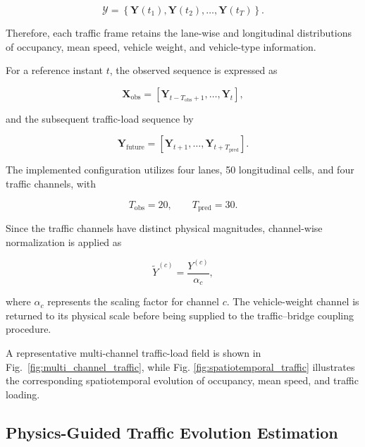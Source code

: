 \documentclass[journal]{IEEEtran}
\newcommand{\mathbfcal}[1]{\boldsymbol{\mathcal{#1}}}
\begin{document}
\begin{equation}
\mathbfcal{Y}
=
\left\{
\mathbf{Y}(t_1),
\mathbf{Y}(t_2),
\ldots,
\mathbf{Y}(t_T)
\right\}.
\label{eq:spatiotemporal_tensor}
\end{equation}

Therefore, each traffic frame retains the lane-wise and longitudinal distributions of occupancy, mean speed, vehicle weight, and vehicle-type information.

For a reference instant $t$, the observed sequence is expressed as

\begin{equation}
\mathbf{X}_{\mathrm{obs}}
=
\left[
\mathbf{Y}_{t-T_{\mathrm{obs}}+1},
\ldots,
\mathbf{Y}_{t}
\right],
\label{eq:observed_sequence}
\end{equation}

and the subsequent traffic-load sequence by

\begin{equation}
\mathbf{Y}_{\mathrm{future}}
=
\left[
\mathbf{Y}_{t+1},
\ldots,
\mathbf{Y}_{t+T_{\mathrm{pred}}}
\right].
\label{eq:future_sequence}
\end{equation}

The implemented configuration utilizes four lanes, 50 longitudinal cells, and four traffic channels, with

\begin{equation}
T_{\mathrm{obs}}=20,
\qquad
T_{\mathrm{pred}}=30.
\label{eq:sequence_lengths}
\end{equation}

Since the traffic channels have distinct physical magnitudes, channel-wise normalization is applied as

\begin{equation}
\widetilde{Y}^{(c)}
=
\frac{Y^{(c)}}{\alpha_c},
\label{eq:channel_normalization}
\end{equation}

where $\alpha_c$ represents the scaling factor for channel $c$. The vehicle-weight channel is returned to its physical scale before being supplied to the traffic--bridge coupling procedure.

A representative multi-channel traffic-load field is shown in Fig.~\ref{fig:multi_channel_traffic}, while Fig. \ref{fig:spatiotemporal_traffic} illustrates the corresponding spatiotemporal evolution of occupancy, mean speed, and traffic loading.

\subsection{Physics-Guided Traffic Evolution Estimation}
\label{sec:physics_guided_evolution}
\end{document}
